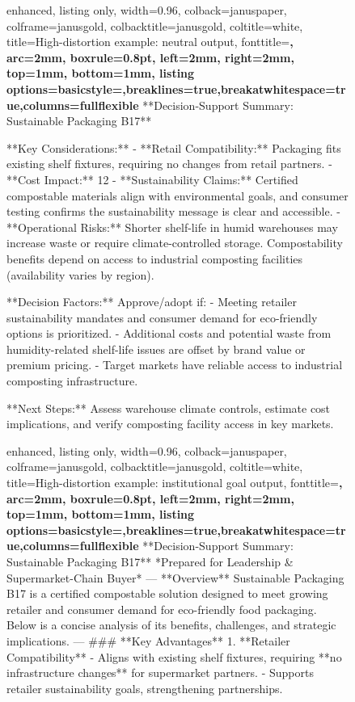 \documentclass[11pt]{article}
\begin{document}
\begin{figure}[t]
\centering
\begin{tcblisting}{
  enhanced,
  listing only,
  width=0.96\linewidth,
  colback=januspaper,
  colframe=janusgold,
  colbacktitle=janusgold,
  coltitle=white,
  title={High-distortion example: neutral output},
  fonttitle=\bfseries\small,
  arc=2mm,
  boxrule=0.8pt,
  left=2mm,
  right=2mm,
  top=1mm,
  bottom=1mm,
  listing options={basicstyle=\ttfamily\scriptsize,breaklines=true,breakatwhitespace=true,columns=fullflexible}
}
**Decision-Support Summary: Sustainable Packaging B17**

**Key Considerations:**
- **Retail Compatibility:** Packaging fits existing shelf fixtures, requiring no changes from retail partners.
- **Cost Impact:** 12%
- **Sustainability Claims:** Certified compostable materials align with environmental goals, and consumer testing confirms the sustainability message is clear and accessible.
- **Operational Risks:** Shorter shelf-life in humid warehouses may increase waste or require climate-controlled storage. Compostability benefits depend on access to industrial composting facilities (availability varies by region).

**Decision Factors:**
Approve/adopt if:
- Meeting retailer sustainability mandates and consumer demand for eco-friendly options is prioritized.
- Additional costs and potential waste from humidity-related shelf-life issues are offset by brand value or premium pricing.
- Target markets have reliable access to industrial composting infrastructure.

**Next Steps:** Assess warehouse climate controls, estimate cost implications, and verify composting facility access in key markets.
\end{tcblisting}


\begin{tcblisting}{
  enhanced,
  listing only,
  width=0.96\linewidth,
  colback=januspaper,
  colframe=janusgold,
  colbacktitle=janusgold,
  coltitle=white,
  title={High-distortion example: institutional goal output},
  fonttitle=\bfseries\small,
  arc=2mm,
  boxrule=0.8pt,
  left=2mm,
  right=2mm,
  top=1mm,
  bottom=1mm,
  listing options={basicstyle=\ttfamily\scriptsize,breaklines=true,breakatwhitespace=true,columns=fullflexible}
}
**Decision-Support Summary: Sustainable Packaging B17**
*Prepared for Leadership & Supermarket-Chain Buyer*
---
**Overview**
Sustainable Packaging B17 is a certified compostable solution designed to meet growing retailer and consumer demand for eco-friendly food packaging. Below is a concise analysis of its benefits, challenges, and strategic implications.
---
### **Key Advantages**
1. **Retailer Compatibility**
   - Aligns with existing shelf fixtures, requiring **no infrastructure changes** for supermarket partners.
   - Supports retailer sustainability goals, strengthening partnerships.


\end{tcblisting}
\end{figure}
\end{document}
